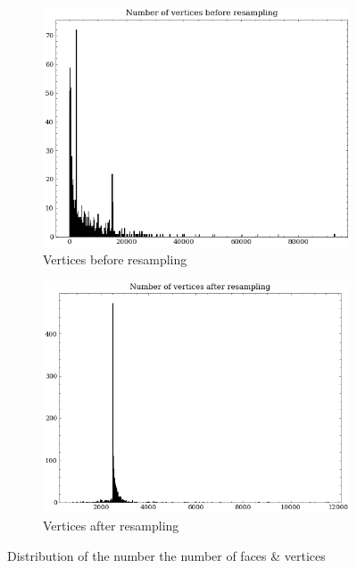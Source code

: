 \begin{figure}[H]
\vspace{1cm}
    \begin{subfigure}[b]{0.45\textwidth}
        \centering
        \includegraphics[width=\textwidth]{assets/preprocessing/Number_of_vertices_before_resampling.png}
        \caption{Vertices before resampling}
        \label{fig:resampling-vertices-before}
    \end{subfigure}
    \hfill
    \begin{subfigure}[b]{0.45\textwidth}
        \centering
        \includegraphics[width=\textwidth]{assets/preprocessing/Number_of_vertices_after_resampling.png}
        \caption{Vertices after resampling}
        \label{fig:resampling-vertices-after}
    \end{subfigure}
    \caption{Distribution of the number the number of faces \& vertices}
    \label{fig:resampling-faces-vertices}
\end{figure}

